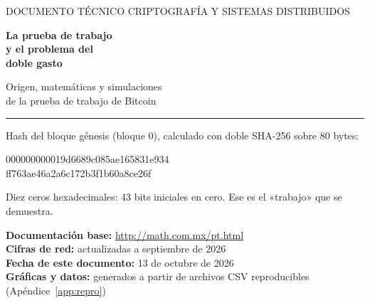 \documentclass[11pt,a4paper]{article}
\newcommand{\webhint}[1]{}
\begin{document}
\webhint{section; id=portada; slug=inicio; kicker=origen · problema · solución · simulación; role=hero}
\begin{titlepage}
\thispagestyle{empty}
\vspace*{1.2cm}
{\sffamily\small\color{pbgray}DOCUMENTO TÉCNICO \textperiodcentered{} CRIPTOGRAFÍA Y SISTEMAS DISTRIBUIDOS\par}
\vspace{1.4cm}
{\sffamily\bfseries\fontsize{30}{34}\selectfont\color{pbblue} La prueba de trabajo\\[0.2em] y el problema del\\[0.2em] doble gasto\par}
\vspace{0.9cm}
{\sffamily\large\color{black!75} Origen, matemáticas y simulaciones\\ de la prueba de trabajo de Bitcoin\par}
\vspace{1.2cm}
{\color{pbblue}\rule{\linewidth}{1.2pt}}
\vspace{0.8cm}

{\sffamily\small\color{pbgray}Hash del bloque génesis (bloque 0), calculado con doble SHA-256 sobre 80 bytes:\par}
\vspace{0.4em}
{\ttfamily\large
{\color{pborange}0000000000}19d6689c085ae165831e934\\
ff763ae46a2a6c172b3f1b60a8ce26f\par}
\vspace{0.4em}
{\sffamily\small\color{pbgray}Diez ceros hexadecimales: 43 bits iniciales en cero. Ese es el «trabajo» que se demuestra.\par}

\vfill
{\sffamily\small\color{black!70}
\textbf{Documentación base:} \url{http://math.com.mx/pt.html}\\
\textbf{Cifras de red:} actualizadas a septiembre de 2026\\
\textbf{Fecha de este documento:} 13 de octubre de 2026\\
\textbf{Gráficas y datos:} generados a partir de archivos CSV reproducibles (Apéndice~\ref{app:repro})\par}
\end{titlepage}

\setcounter{page}{2}
\end{document}
